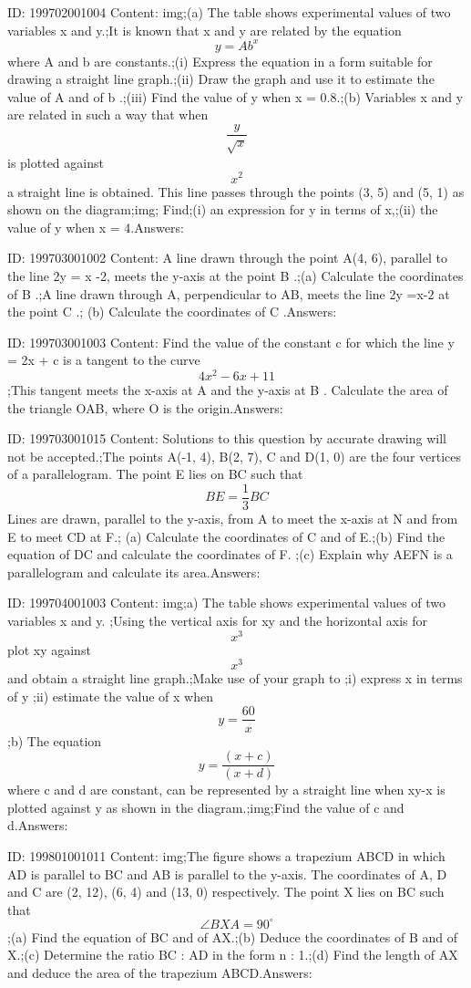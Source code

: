 \documentclass{article}
\begin{document}
ID: 199702001004
Content:
img;(a)	The table shows experimental values of two variables x and y.;It is known that x and y are related by the equation \[y=Ab^x\] where A and b are constants.;(i)	Express the equation in a form suitable for drawing a straight line graph.;(ii)	Draw the graph and use it to estimate the value of A and of b .;(iii)	Find the value of y when x = 0.8.;(b)	Variables x and y are related in such a way that when \[\frac{y}{\sqrt{x}}\] is plotted against \[x^{2}\] a straight line is obtained. This line passes through the points (3, 5) and (5, 1) as shown on the diagram;img; Find;(i)	an expression for y in terms of x,;(ii)	the value of y when x = 4.Answers:

ID: 199703001002
Content:
A line drawn through the point A(4, 6), parallel to the line 2y = x -2, meets the y-axis at the point B .;(a)	Calculate the coordinates of B .;A line drawn through A, perpendicular to AB, meets the line 2y =x-2 at the point C .; (b)	Calculate the coordinates of C .Answers:

ID: 199703001003
Content:
Find the value of the constant c for which the line y = 2x + c is a tangent to the curve \[4x^2-6x+11\];This tangent meets the x-axis at A and the y-axis at B . Calculate the area of the triangle OAB, where O is the origin.Answers:

ID: 199703001015
Content:
Solutions to this question by accurate drawing will not be accepted.;The points A(-1, 4), B(2, 7), C and D(1, 0) are the four vertices of a parallelogram. The point E lies on BC such that \[BE =\frac{1}{3} BC\]  Lines are drawn, parallel to the y-axis, from A to meet the x-axis at N and from E to meet CD at F.; (a)	Calculate the coordinates of C and of E.;(b)	Find the equation of DC and calculate the coordinates of F. ;(c) Explain why AEFN is a parallelogram and calculate its area.Answers:

ID: 199704001003
Content:
img;a) The table shows experimental values of two variables x and y. ;Using the vertical axis for xy and the horizontal axis for \[x^3\] plot xy against \[x^3\]and obtain a straight line graph.;Make use of your graph to ;i) express x in terms of y ;ii) estimate the value of x when \[y=\frac{60}{x}\] ;b) The equation \[y=\frac{(x+c)}{(x+d)}\] where c and d are constant, can be represented by a straight line when xy-x is plotted against y as shown in the diagram.;img;Find the value of c and d.Answers:

ID: 199801001011
Content:
img;The figure shows a trapezium ABCD in which AD is parallel to BC and AB is parallel to the y-axis. The coordinates of A, D and C are (2, 12), (6, 4) and (13, 0) respectively. The point X lies on BC such that \[\angle BXA=90^{\circ}\];(a)	Find the equation of BC and of AX.;(b)	Deduce the coordinates of B and of X.;(c)	Determine the ratio BC : AD in the form n : 1.;(d)	Find the length of AX and deduce the area of the trapezium ABCD.Answers:
\end{document}
